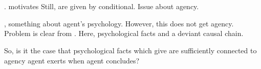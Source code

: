 \chapter{}
\label{cha:embed}

\begin{note}
  .
   motivates 
  Still,  are given by conditional.
  Issue about agency.

  , something about agent's psychology.
  However, this does not get agency.
  Problem is clear from \citeauthor{Davidson:1973vd}.
  Here, psychological facts and a deviant causal chain.

  So, is it the case that psychological facts which give \requ{} are sufficiently connected to agency agent exerts when agent concludes?
\end{note}

\section{}
\label{sec:infl}


